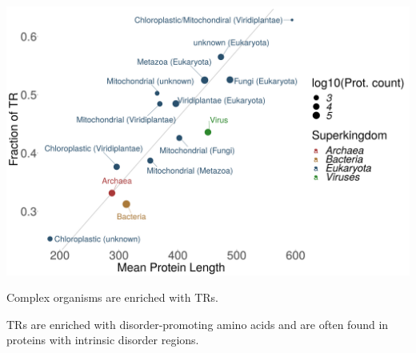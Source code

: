 \documentclass[a0paper,fleqn]{betterposter}
\begin{document}
{\begin{center}
    \includegraphics[width=\textwidth]{figures/Mean_Prot_length_vs_Frac_TR.png}
\end{center}
Complex organisms are enriched with TRs.

TRs are enriched with disorder-promoting amino acids and are often found in proteins with intrinsic disorder regions.

}
\end{document}
